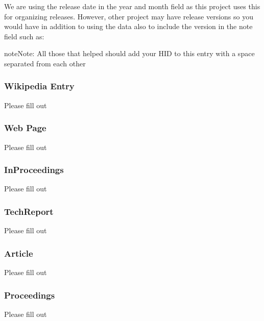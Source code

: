 We are using the release date in the year and month field as this
project uses this for organizing releases. However, other project may
have release versions so you would have in addition to using the data
also to include the version in the note field such as:

\begin{sphinxVerbatim}[commandchars=\\\{\}]
         
\end{sphinxVerbatim}

\begin{sphinxadmonition}{note}{Note:}
All those that helped should add your HID to this entry with
a space separated from each other
\end{sphinxadmonition}


\subsubsection{Wikipedia Entry}
\label{\detokenize{lesson/doc/bibtex:wikipedia-entry}}
Please fill out


\subsubsection{Web Page}
\label{\detokenize{lesson/doc/bibtex:web-page}}
Please fill out


\subsubsection{InProceedings}
\label{\detokenize{lesson/doc/bibtex:inproceedings}}
Please fill out


\subsubsection{TechReport}
\label{\detokenize{lesson/doc/bibtex:techreport}}
Please fill out


\subsubsection{Article}
\label{\detokenize{lesson/doc/bibtex:article}}
Please fill out


\subsubsection{Proceedings}
\label{\detokenize{lesson/doc/bibtex:proceedings}}
Please fill out


